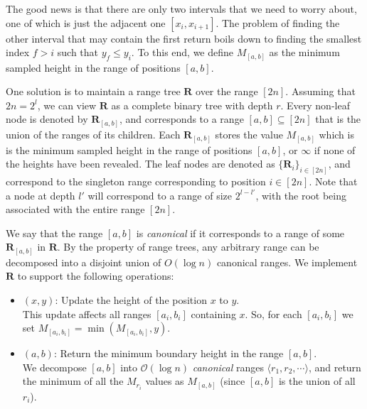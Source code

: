 The good news is that there are only two intervals that we need to worry about, one of which is just the adjacent one $[x_i, x_{i+1}]$.
The problem of finding the other interval that may contain the first return boils down to finding the smallest index $f>i$ such that $y_f\le y_i$.
To this end, we define $M_{[a,b]}$ as the minimum sampled height in the range of positions $[a,b]$.

One solution is to maintain a range tree $\mathbf R$ \cite{comp_geo} over the range $[2n]$.
Assuming that $2n = 2^l$, we can view $\mathbf R$ as a complete binary tree with depth $r$.
Every non-leaf node is denoted by $\mathbf R_{[a,b]}$, and corresponds to a range $[a,b]\subseteq[2n]$ that is the union of the ranges of its children.
Each $\mathbf R_{[a,b]}$ stores the value $M_{[a,b]}$ which is is the minimum sampled height
in the range of positions $[a,b]$, or $\infty$ if none of the heights have been revealed.
The leaf nodes are denoted as $\{\mathbf R_i\}_{i\in[2n]}$, and correspond to the singleton range corresponding to position $i\in [2n]$.
Note that a node at depth $l'$ will correspond to a range of size $2^{l-l'}$, with the root being associated with the entire range $[2n]$.

We say that the range $[a,b]$ is \emph{canonical} if it corresponds to a range of some $\mathbf{R}_{[a,b]}$ in $\mathbf R$.
By the property of range trees, any arbitrary range can be decomposed into a disjoint union of $O(\log n)$ canonical ranges.
We implement $\mathbf{R}$ to support the following operations:
\begin{itemize}
    \item {}$(x,y)$: Update the height of the position $x$ to $y$.\\
    This update affects all ranges $[a_i,b_i]$ containing $x$.
    So, for each $[a_i,b_i]$ we set $M_{[a_i,b_i]} = \min\left( M_{[a_i,b_i]}, y\right)$.
    \item {}$(a,b)$: Return the minimum boundary height in the range $[a,b]$.\\
    We decompose $[a,b]$ into $\mathcal O(\log n)$ \emph{canonical} ranges $ \langle r_1, r_2,\cdots\rangle$,
    and return the minimum of all the $M_{r_i}$ values as $M_{[a,b]}$ (since $[a,b]$ is the union of all $r_i$).
\end{itemize}

